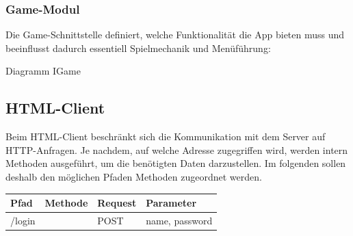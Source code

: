 \subsubsection{Game-Modul}
Die Game-Schnittstelle definiert, welche Funktionalität die App bieten muss und beeinflusst dadurch essentiell Spielmechanik und Menüführung:

Diagramm IGame

\subsection{HTML-Client}
Beim HTML-Client beschränkt sich die Kommunikation mit dem Server auf HTTP-Anfragen. Je nachdem, auf welche Adresse zugegriffen wird, werden intern Methoden ausgeführt, um die benötigten Daten darzustellen. Im folgenden sollen deshalb den möglichen Pfaden Methoden zugeordnet werden.

\begin{table}[h]
    \begin{tabular}{|l|l|l|l|}
    \hline Pfad & Methode & Request & Parameter\\ 
    \hline /login & ~ & POST & name, password\\ 
    	\hline
    \end{tabular}
\end{table}